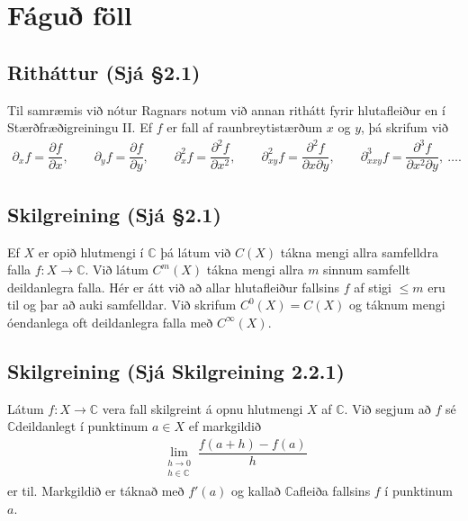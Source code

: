 \documentclass[a4paper,10pt,icelandic]{sphinxmanual}
\begin{document}
\section{Fáguð föll}
\label{\detokenize{Kafli02:id2}}

\subsection{Ritháttur (Sjá \S{}2.1)}
\label{\detokenize{Kafli02:rithattur-sja-2-1}}
Til samræmis við nótur Ragnars notum við annan
rithátt fyrir hlutafleiður en í Stærðfræðigreiningu II. Ef \(f\) er
fall af raunbreytistærðum \(x\) og \(y\), þá skrifum við
\begin{equation*}
\begin{split}{\partial}_xf=\dfrac{\partial f}{\partial x}, \qquad
{\partial}_yf=\dfrac{\partial f}{\partial y}, \qquad
{\partial}_x^2f=\dfrac{\partial^2f}{\partial x^2}, \qquad
{\partial}_{xy}^2f=\dfrac{\partial^2f}{\partial x\partial y}, \qquad
{\partial}_{xxy}^3f=\dfrac{\partial^3f}{\partial x^2\partial y}, \ \dots.\end{split}
\end{equation*}

\subsection{Skilgreining (Sjá \S{}2.1)}
\label{\detokenize{Kafli02:id3}}
Ef \(X\) er opið hlutmengi í \({\mathbb{C}}\)
þá látum við \(C(X)\) tákna mengi allra samfelldra falla
\(f:X\to {\mathbb{C}}\). Við látum \(C^m(X)\) tákna mengi allra
\(m\) sinnum samfellt deildanlegra falla. Hér er átt við að allar
hlutafleiður fallsins \(f\) af stigi \(\leq m\) eru til og þar
að auki samfelldar. Við skrifum \(C^0(X)=C(X)\) og táknum mengi
óendanlega oft deildanlegra falla með \(C^{\infty}(X)\).


\subsection{Skilgreining (Sjá Skilgreining 2.2.1)}
\label{\detokenize{Kafli02:skilgreining-sja-skilgreining-2-2-1}}
Látum \(f:X\to {\mathbb{C}}\) vera
fall skilgreint á opnu hlutmengi \(X\) af \({\mathbb{C}}\). Við segjum að
\(f\) sé \({\mathbb{C}}\)\textendash{}deildanlegt í punktinum \(a\in X\) ef
markgildið
\begin{equation*}
\begin{split}\lim _{\substack{ h\to 0\\ h\in{\mathbb{C}}}}
 \dfrac{f(a+h)-f(a)}h  \label{4.2.3}\end{split}
\end{equation*}
er til. Markgildið er táknað með \(f'(a)\) og kallað
\({\mathbb{C}}\)\textendash{}afleiða fallsins \(f\) í punktinum \(a\).
\end{document}

